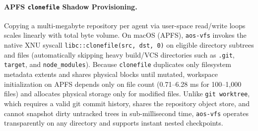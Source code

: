 \documentclass[acmsmall,screen,review]{acmart}
\begin{document}
\paragraph{APFS \texttt{clonefile} Shadow Provisioning.} Copying a multi-megabyte repository per agent via user-space read/write loops scales linearly with total byte volume. On macOS (APFS), \texttt{aos-vfs} invokes the native XNU syscall \texttt{libc::clonefile(src, dst, 0)} on eligible directory subtrees and files (automatically skipping heavy build/VCS directories such as \texttt{.git}, \texttt{target}, and \texttt{node\_modules}). Because \texttt{clonefile} duplicates only filesystem metadata extents and shares physical blocks until mutated, workspace initialization on APFS depends only on file count (0.71--6.28 ms for 100--1,000 files) and allocates physical storage only for modified files. Unlike \texttt{git worktree}, which requires a valid git commit history, shares the repository object store, and cannot snapshot dirty untracked trees in sub-millisecond time, \texttt{aos-vfs} operates transparently on any directory and supports instant nested checkpoints.
\end{document}
